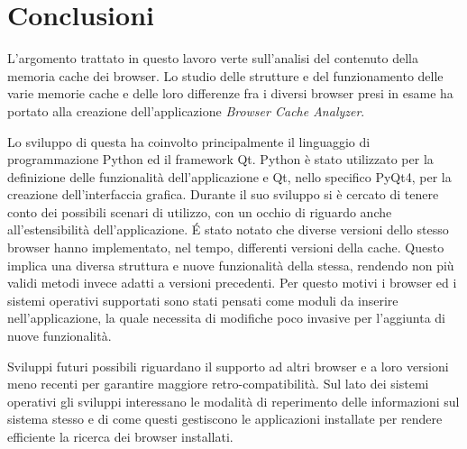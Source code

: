 \chapter{Conclusioni}

L'argomento trattato in questo lavoro verte sull'analisi del contenuto della memoria cache dei browser. 
Lo studio delle strutture e del funzionamento delle varie memorie cache e delle loro differenze fra i diversi browser presi in esame ha portato alla creazione dell'applicazione \textit{Browser Cache Analyzer}.

Lo sviluppo di questa ha coinvolto principalmente il linguaggio di programmazione Python ed il framework Qt. Python è stato utilizzato per la definizione delle funzionalità dell'applicazione e Qt, nello specifico PyQt4, per la creazione dell'interfaccia grafica. Durante il suo sviluppo si è cercato di tenere conto dei possibili scenari di utilizzo, con un occhio di riguardo anche all'estensibilità dell'applicazione. \'E stato notato che diverse versioni dello stesso browser hanno implementato, nel tempo, differenti versioni della cache. Questo implica una diversa struttura e nuove funzionalità della stessa, rendendo non più validi metodi invece adatti a versioni precedenti. Per questo motivi i browser ed i sistemi operativi supportati sono stati pensati come moduli da inserire nell'applicazione, la quale necessita di modifiche poco invasive per l'aggiunta di nuove funzionalità.

Sviluppi futuri possibili riguardano il supporto ad altri browser e a loro versioni meno recenti per garantire maggiore retro-compatibilità. Sul lato dei sistemi operativi gli sviluppi interessano le modalità di reperimento delle informazioni sul sistema stesso e di come questi gestiscono le applicazioni installate per rendere efficiente la ricerca dei browser installati. 
